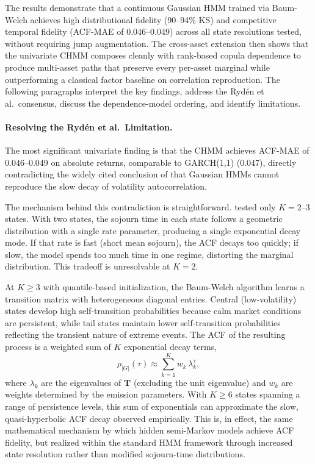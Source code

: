 The results demonstrate that a continuous Gaussian HMM trained via Baum-Welch achieves high distributional fidelity (90--94\% KS) and competitive temporal fidelity (ACF-MAE of 0.046--0.049) across all state resolutions tested, without requiring jump augmentation.
The cross-asset extension then shows that the univariate CHMM composes cleanly with rank-based copula dependence to produce multi-asset paths that preserve every per-asset marginal while outperforming a classical factor baseline on correlation reproduction.
The following paragraphs interpret the key findings, address the Ryd\'{e}n et al.\ consensus, discuss the dependence-model ordering, and identify limitations.

\paragraph{Resolving the Ryd\'{e}n et al.\ Limitation.}
The most significant univariate finding is that the CHMM achieves ACF-MAE of 0.046--0.049 on absolute returns, comparable to GARCH(1,1) (0.047), directly contradicting the widely cited conclusion of \citet{ryden1998stylized} that Gaussian HMMs cannot reproduce the slow decay of volatility autocorrelation.

The mechanism behind this contradiction is straightforward.
\citet{ryden1998stylized} tested only $K = 2$--$3$ states.
With two states, the sojourn time in each state follows a geometric distribution with a single rate parameter, producing a single exponential decay mode.
If that rate is fast (short mean sojourn), the ACF decays too quickly; if slow, the model spends too much time in one regime, distorting the marginal distribution.
This tradeoff is unresolvable at $K = 2$.

At $K \geq 3$ with quantile-based initialization, the Baum-Welch algorithm learns a transition matrix with heterogeneous diagonal entries.
Central (low-volatility) states develop high self-transition probabilities because calm market conditions are persistent, while tail states maintain lower self-transition probabilities reflecting the transient nature of extreme events.
The ACF of the resulting process is a weighted sum of $K$ exponential decay terms,
\begin{equation}
    \rho_{|G|}(\tau) \approx \sum_{k=1}^{K} w_k \, \lambda_k^{\tau},
    \label{eq:acf_mixture}
\end{equation}
where $\lambda_k$ are the eigenvalues of $\mathbf{T}$ (excluding the unit eigenvalue) and $w_k$ are weights determined by the emission parameters.
With $K \geq 6$ states spanning a range of persistence levels, this sum of exponentials can approximate the slow, quasi-hyperbolic ACF decay observed empirically.
This is, in effect, the same mathematical mechanism by which hidden semi-Markov models \cite{bulla2006stylized} achieve ACF fidelity, but realized within the standard HMM framework through increased state resolution rather than modified sojourn-time distributions.

